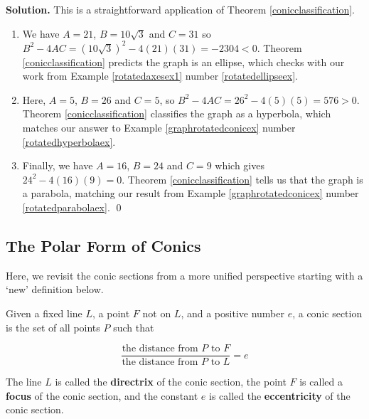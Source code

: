 \documentclass{ximera}
\begin{document}
{\begin{example}
{\bf Solution.} This is a straightforward application of Theorem \ref{conicclassification}.

 \begin{enumerate}
 
\item  We have $A = 21$, $B = 10\sqrt{3}$ and $C = 31$ so $B^2 - 4AC = (10\sqrt{3})^2 - 4(21)(31) = -2304 < 0$.  Theorem \ref{conicclassification} predicts the graph is an ellipse, which checks with our work from Example \ref{rotatedaxesex1} number \ref{rotatedellipseex}.
 
\item  Here,  $A = 5$, $B = 26$ and $C = 5$, so $B^2 - 4AC = 26^2 - 4(5)(5) = 576 > 0$. Theorem \ref{conicclassification} classifies the graph as a hyperbola, which matches our answer to Example \ref{graphrotatedconicex} number \ref{rotatedhyperbolaex}. 

\item  Finally,  we have $A = 16$, $B = 24$ and $C = 9$ which gives $24^2 - 4(16)(9) = 0$. Theorem \ref{conicclassification} tells us that the graph is a parabola,  matching our result from Example \ref{graphrotatedconicex} number \ref{rotatedparabolaex}. \qed

\end{enumerate}

\end{example}


\subsection{The Polar Form of Conics}
\label{polarformofconics}

Here, we revisit the conic sections from a more unified perspective starting with a  `new' definition below.

\smallskip

\begin{definition} \label{focusdirectrixeccentrityconic} Given a fixed line $L$,  a point $F$  not on $L$, and a positive number $e$, a conic section is the set of all points $P$ such that

\[ \dfrac{\text{the distance from $P$ to $F$}}{\text{the distance from $P$ to $L$}} = e\]

The line $L$ is called the \textbf{directrix} of the conic section, the point $F$ is called a \textbf{focus} of the conic section, and the constant $e$ is called the \textbf{eccentricity} of the conic section.


\end{definition}}
\end{document}

